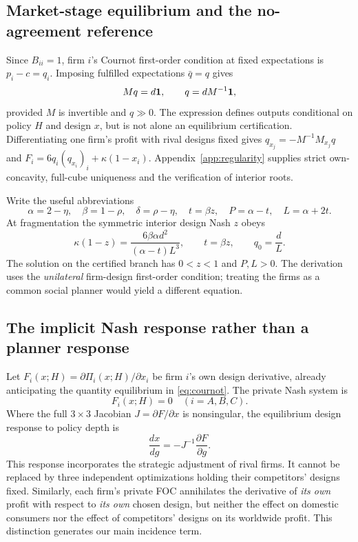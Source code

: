 \documentclass[11pt,a4paper]{article}
\theoremstyle{remark}\newtheorem{remark}[theorem]{Remark}
\begin{document}
\subsection{Market-stage equilibrium and the no-agreement reference}
Since $B_{ii}=1$, firm $i$'s Cournot first-order condition at fixed expectations is $p_i-c=q_i$. Imposing fulfilled expectations $\bar q=q$ gives
\begin{equation}\label{eq:cournot}
M q=d\boldsymbol{1},\qquad q=d M^{-1}\boldsymbol{1},
\end{equation}
provided $M$ is invertible and $q\gg0$. The expression defines outputs conditional on policy $H$ and design $x$, but is not alone an equilibrium certification. Differentiating one firm's profit with rival designs fixed gives $q_{x_j}=-M^{-1}M_{x_j}q$ and $F_i=6q_i(q_{x_i})_i+\kappa(1-x_i)$. Appendix~\ref{app:regularity} supplies strict own-concavity, full-cube uniqueness and the verification of interior roots.

Write the useful abbreviations
\begin{equation}\label{eq:abbrev}
\alpha=2-\eta,\quad\beta=1-\rho,\quad\delta=\rho-\eta,\quad
t=\beta z,\quad P=\alpha-t,\quad L=\alpha+2t.
\end{equation}
At fragmentation the symmetric interior design Nash $z$ obeys
\begin{equation}\label{eq:root}
\kappa(1-z)=\frac{6\beta\alpha d^2}{(\alpha-t)L^3},\qquad t=\beta z,\qquad q_0=\frac dL.
\end{equation}
The solution on the certified branch has $0<z<1$ and $P,L>0$. The derivation uses the \emph{unilateral} firm-design first-order condition; treating the firms as a common social planner would yield a different equation.

\subsection{The implicit Nash response rather than a planner response}
Let $F_i(x;H)=\partial\Pi_i(x;H)/\partial x_i$ be firm $i$'s own design derivative, already anticipating the quantity equilibrium in \eqref{eq:cournot}. The private Nash system is
\begin{equation}\label{eq:designFOC}
F_i(x;H)=0\quad (i=A,B,C).
\end{equation}
Where the full $3\times3$ Jacobian $J=\partial F/\partial x$ is nonsingular, the equilibrium design response to policy depth is
\begin{equation}\label{eq:implicit}
\frac{dx}{dg}=-J^{-1}\frac{\partial F}{\partial g}.
\end{equation}
This response incorporates the strategic adjustment of rival firms. It cannot be replaced by three independent optimizations holding their competitors' designs fixed. Similarly, each firm's private FOC annihilates the derivative of \emph{its own} profit with respect to \emph{its own} chosen design, but neither the effect on domestic consumers nor the effect of competitors' designs on its worldwide profit. This distinction generates our main incidence term.
\end{document}
